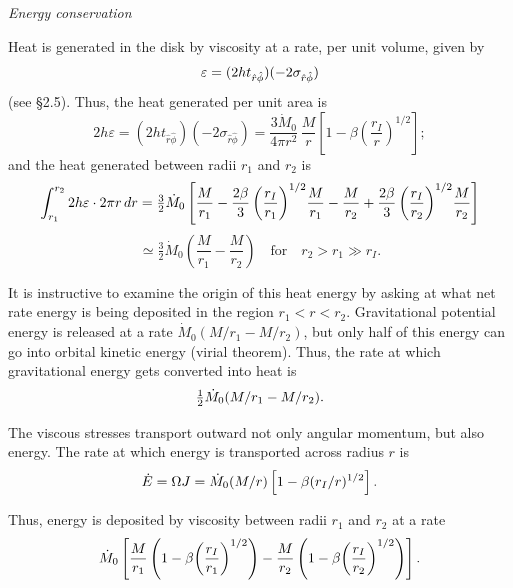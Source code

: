 
\textit{Energy conservation}

Heat is generated in the disk by viscosity at a rate, per unit volume, given by
\begin{equation}
\varepsilon = (2h t_{\hat{r}\hat{\phi}})(-2\sigma_{\hat{r}\hat{\phi}})
\notag
\end{equation}
(see \S2.5). Thus, the heat generated per unit area is
\begin{equation}
2h\varepsilon = (2h t_{\hat{r}\hat{\phi}})(-2\sigma_{\hat{r}\hat{\phi}})
= \frac{3\dot{M}_0}{4\pi r^2}\,\frac{M}{r}
\left[1 - \beta\!\left(\frac{r_I}{r}\right)^{1/2}\right];
\tag{5.2.19}
\end{equation}
and the heat generated between radii $r_1$ and $r_2$ is
\begin{equation}
\int_{r_1}^{r_2} 2h\varepsilon\cdot 2\pi r\,dr
= \tfrac{3}{2}\dot{M}_0
\left[\frac{M}{r_1}
- \frac{2\beta}{3}\left(\frac{r_I}{r_1}\right)^{1/2}\!\frac{M}{r_1}
- \frac{M}{r_2}
+ \frac{2\beta}{3}\left(\frac{r_I}{r_2}\right)^{1/2}\!\frac{M}{r_2}
\right]
\notag
\end{equation}
\begin{equation}
\simeq \tfrac{3}{2}\dot{M}_0
\left(\frac{M}{r_1} - \frac{M}{r_2}\right)
\quad \text{for} \quad r_2 > r_1 \gg r_I.
\tag{5.2.20}
\end{equation}

It is instructive to examine the origin of this heat energy by asking at what
net rate energy is being deposited in the region $r_1 < r < r_2$. Gravitational
potential energy is released at a rate $\dot{M}_0(M/r_1 - M/r_2)$, but only half of this
energy can go into orbital kinetic energy
(virial theorem). Thus, the rate at which gravitational energy gets converted
into heat is
\begin{equation}
\tfrac{1}{2}\dot{M}_0(M/r_1 - M/r_2).
\notag
\end{equation}

The viscous stresses transport outward not only angular momentum, but also
energy. The rate at which energy is transported across radius $r$ is
\begin{equation}
\dot{E} = \Omega J = \dot{M}_0(M/r)\left[1 - \beta(r_I/r)^{1/2}\right].
\notag
\end{equation}

Thus, energy is deposited by viscosity between radii $r_1$ and $r_2$ at a rate
\begin{equation}
\dot{M}_0
\left[\frac{M}{r_1}\left(1 - \beta\!\left(\frac{r_I}{r_1}\right)^{1/2}\right)
- \frac{M}{r_2}\left(1 - \beta\!\left(\frac{r_I}{r_2}\right)^{1/2}\right)
\right].
\notag
\end{equation}

